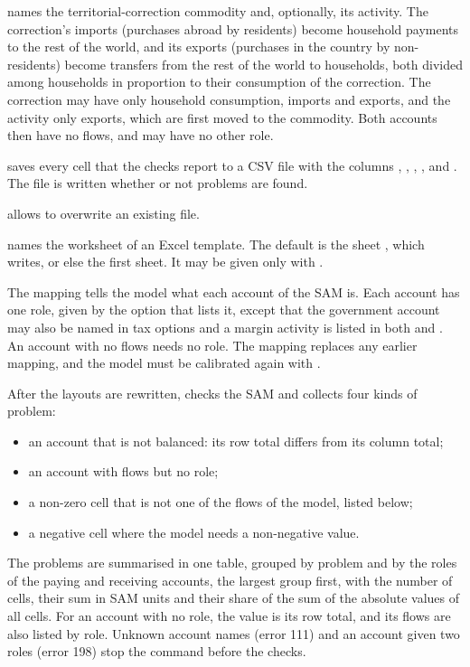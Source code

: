 \begin{optdesc}
\item[\optarg{}{territorial}{commodity [activity]}] names the
territorial-correction commodity and, optionally, its activity. The
correction's imports (purchases abroad by residents) become household payments
to the rest of the world, and its exports (purchases in the country by
non-residents) become transfers from the rest of the world to households, both
divided among households in proportion to their consumption of the correction.
The correction may have only household consumption, imports and exports, and
the activity only exports, which are first moved to the commodity. Both
accounts then have no flows, and may have no other role.

\item[\optarg{}{report}{filename}] saves every cell that the checks report to a
CSV file with the columns , , ,
,  and . The file is written
whether or not problems are found.

\item[\opt{}{replace}] allows  to overwrite an existing file.

\item[\optarg{}{sheet}{sheetname}] names the worksheet of an Excel template.
The default is the sheet , which  writes,
or else the first sheet. It may be given only with .
\end{optdesc}


The mapping tells the model what each account of the SAM is. Each account has
one role, given by the option that lists it, except that the government
account may also be named in tax options and a margin activity is listed in
both  and . An account with no flows needs no
role. The mapping replaces any earlier mapping, and the model must be
calibrated again with .


After the layouts are rewritten,  checks the SAM and collects four
kinds of problem:
\begin{itemize}
\item an account that is not balanced: its row total differs from its column
total;
\item an account with flows but no role;
\item a non-zero cell that is not one of the flows of the model, listed below;
\item a negative cell where the model needs a non-negative value.
\end{itemize}
The problems are summarised in one table, grouped by problem and by the roles
of the paying and receiving accounts, the largest group first, with the number
of cells, their sum in SAM units and their share of the sum of the absolute
values of all cells. For an account with no role, the value is its row total,
and its flows are also listed by role. Unknown account names (error 111) and an
account given two roles (error 198) stop the command before the checks.

